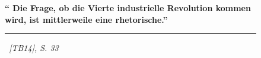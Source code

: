 
\newcommand{\Autor}{\ [TB14], S. 33 }
\newcommand{\Datum}{}
\newcommand{\Spruch}{Die Frage, ob die Vierte industrielle Revolution kommen wird, ist mittlerweile eine 
rhetorische.}

\begin{figure}

\begin{center}
	\begin{minipage}[H]{0.9\textwidth}		
		\begin{center}
		{\huge\textbf{	\enquote{ \Spruch}}}
		\end{center}		
	\end{minipage}	
\end{center}
	\begin{flushright}
		\begin{minipage}[H]{0.5\textwidth}	
			\begin{flushright}
				\noindent\rule{\textwidth}{1.2pt}			
				{\large \textit{\Autor} \Datum}
			\end{flushright}
		\end{minipage}
	\end{flushright}
	
\end{figure}